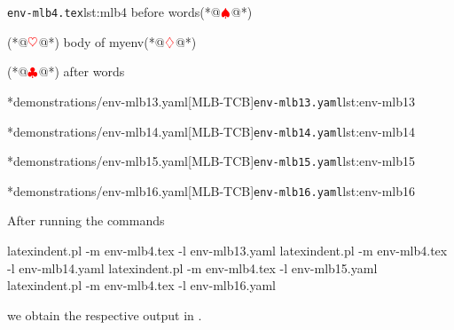 		\begin{minipage}{.45\linewidth}
			\begin{cmhlistings}[style=tcblatex,escapeinside={(*@}{@*)}]{\texttt{env-mlb4.tex}}{lst:mlb4}
before words(*@$\color{red}\spadesuit$@*)
\begin{myenv}(*@$\color{red}\heartsuit$@*)
body of myenv(*@$\color{red}\diamondsuit$@*)
\end{myenv}(*@$\color{red}\clubsuit$@*)
after words
\end{cmhlistings}
		\end{minipage}%
		\hfill
		\begin{minipage}{.51\textwidth}
			\cmhlistingsfromfile[style=yaml-LST]*{demonstrations/env-mlb13.yaml}[MLB-TCB]{\texttt{env-mlb13.yaml}}{lst:env-mlb13}

			\cmhlistingsfromfile[style=yaml-LST]*{demonstrations/env-mlb14.yaml}[MLB-TCB]{\texttt{env-mlb14.yaml}}{lst:env-mlb14}

			\cmhlistingsfromfile[style=yaml-LST]*{demonstrations/env-mlb15.yaml}[MLB-TCB]{\texttt{env-mlb15.yaml}}{lst:env-mlb15}

			\cmhlistingsfromfile[style=yaml-LST]*{demonstrations/env-mlb16.yaml}[MLB-TCB]{\texttt{env-mlb16.yaml}}{lst:env-mlb16}
		\end{minipage}

		After running the commands
		\begin{commandshell}
latexindent.pl -m env-mlb4.tex -l env-mlb13.yaml
latexindent.pl -m env-mlb4.tex -l env-mlb14.yaml
latexindent.pl -m env-mlb4.tex -l env-mlb15.yaml
latexindent.pl -m env-mlb4.tex -l env-mlb16.yaml
\end{commandshell}

		we obtain the respective output in .

		\begin{minipage}{.45\linewidth}
		\end{minipage}
		\hfill
		\begin{minipage}{.45\linewidth}
		\end{minipage}

		\begin{minipage}{.45\linewidth}
		\end{minipage}
		\hfill
		\begin{minipage}{.45\linewidth}
		\end{minipage}


